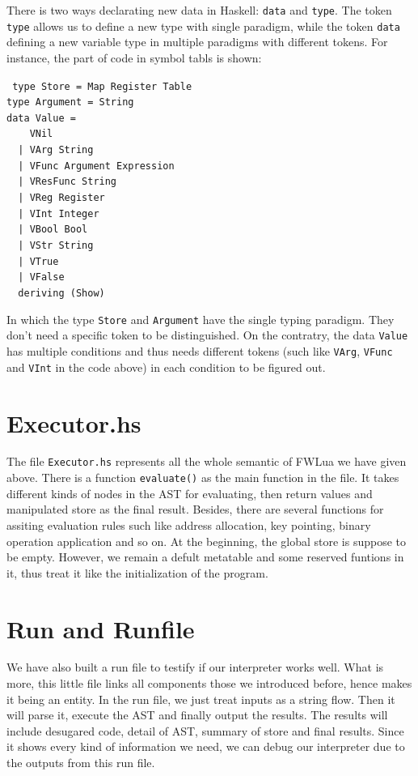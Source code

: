 There is two ways declarating new data in Haskell: {\tt data} and {\tt type}. The token {\tt type} allows us to define a new type with single paradigm, while the token {\tt data} defining a new variable type in multiple paradigms with different tokens. For instance, the part of code in symbol tabls is shown:
\begin{flushleft}
{\tt 
type Store = Map Register Table\\
type Argument = String\\
data Value = \\
~~~~VNil\\
~~| VArg String\\
~~| VFunc Argument Expression\\
~~| VResFunc String\\
~~| VReg Register\\
~~| VInt Integer\\
~~| VBool Bool\\
~~| VStr String\\
~~| VTrue\\
~~| VFalse\\
~~deriving (Show)\\
}
\end{flushleft}
In which the type {\tt Store} and {\tt Argument} have the single typing paradigm. They don't need a specific token to be distinguished. On the contratry, the data {\tt Value} has multiple conditions and thus needs different tokens (such like {\tt VArg}, {\tt VFunc} and {\tt VInt} in the code above) in each condition to be figured out.

\section{Executor.hs}
The file {\tt Executor.hs} represents all the whole semantic of FWLua we have given above. There is a function {\tt evaluate()} as the main function in the file. It takes different kinds of nodes in the AST for evaluating, then return values and manipulated store as the final result. Besides, there are several functions for assiting evaluation rules such like address allocation, key pointing, binary operation application and so on. At the beginning, the global store is suppose to be empty. However, we remain a defult metatable and some reserved funtions in it, thus treat it like the initialization of the program.

\section{Run and Runfile}
We have also built a run file to testify if our interpreter works well. What is more, this little file links all components those we introduced before, hence makes it being an entity. In the run file, we just treat inputs as a string flow. Then it will parse it, execute the AST and finally output the results. The results will include desugared code, detail of AST, summary of store and final results. Since it shows every kind of information we need, we can debug our interpreter due to the outputs from this run file.